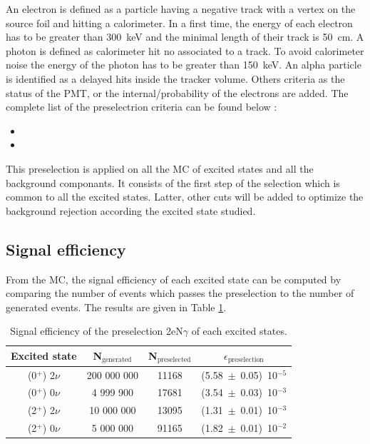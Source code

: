 \documentclass[main.tex]{subfiles}
\begin{document}
\bigskip 

\NI An electron is defined as a particle having a negative track with a vertex on the source foil and hitting a calorimeter. In a first time, the energy of each electron has to be greater than 300~keV and the minimal length of their track is 50~cm.
\noindent A photon is defined as calorimeter hit no associated to a track. To avoid calorimeter noise the energy of the photon has to be greater than 150~keV.
\noindent An alpha particle is identified as a delayed hits inside the tracker volume. Others criteria as the status of the PMT, or the internal/probability of the electrons are added. The complete list of the preselectrion criteria can be found below :


\begin{itemize}
\item
\item
\end{itemize}



\NI This preselection is applied on all the MC of excited states and all the background componants. It consists of the first step of the selection which is common to all the excited states. Latter, other cuts will be added to optimize the background rejection according the excited state studied.


\subsection{Signal efficiency}


\NI From the MC, the signal efficiency of each excited state can be computed by comparing the number of events which passes the preselection to the number of generated events. The results are given in Table \ref{EffPreselection}. 


\bigskip


\begin{table}[h!]
\begin{center}
\begin{tabular}{c|c|c|c}
\toprule
Excited state & N$_\text{{generated}}$ & N$_\text{{preselected}}$ & $\epsilon_\text{{preselection}}$ \\[0.1cm]
\midrule
(0$^+$) 2$\nu$ & 200 000 000 & 11168 & (5.58~$\pm$~0.05)~10$^{-\text{5}}$\\[0.1cm]
(0$^+$) 0$\nu$ &   4 999 900 & 17681 & (3.54~$\pm$~0.03)~10$^{-\text{3}}$\\[0.1cm]
(2$^+$) 2$\nu$ &  10 000 000 & 13095 & (1.31~$\pm$~0.01)~10$^{-\text{3}}$\\[0.1cm]
(2$^+$) 0$\nu$ &   5 000 000 & 91165 & (1.82~$\pm$~0.01)~10$^{-\text{2}}$\\[0.1cm]
\bottomrule
\end{tabular}
\caption{Signal efficiency of the preselection 2eN$\gamma$ of each excited states.}
\label{EffPreselection}
\end{center}
\end{table}
\end{document}
